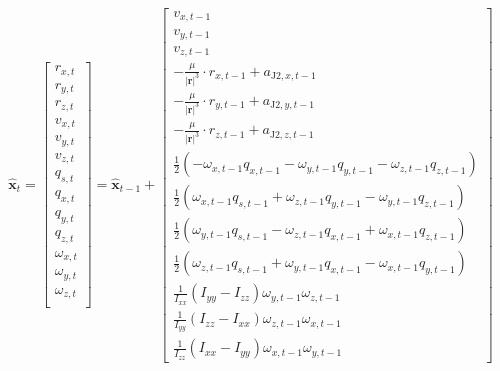 \begin{equation}
    \mathbf{\hat{x}}_t
    =
    \begin{bmatrix}
        r_{x,t} \\
        r_{y,t} \\
        r_{z,t} \\
        v_{x,t} \\
        v_{y,t} \\
        v_{z,t} \\
        q_{s,t} \\
        q_{x,t} \\
        q_{y,t} \\
        q_{z,t} \\
        \omega_{x,t} \\
        \omega_{y,t} \\
        \omega_{z,t} \\
    \end{bmatrix}
    = \mathbf{\hat{x}}_{t-1} +
    \begin{bmatrix}
        v_{x,t-1} \\
        v_{y,t-1} \\
        v_{z,t-1} \\
        -\frac{\mu}{|\mathbf{r}|^3}\cdot r_{x,t-1} + a_{\text{J2},x,t-1} \\
        -\frac{\mu}{|\mathbf{r}|^3}\cdot r_{y,t-1} + a_{\text{J2},y,t-1} \\
        -\frac{\mu}{|\mathbf{r}|^3}\cdot r_{z,t-1} + a_{\text{J2},z,t-1} \\
        \frac{1}{2}(-\omega_{x,t-1}q_{x,t-1} - \omega_{y,t-1}q_{y,t-1} - \omega_{z,t-1}q_{z,t-1}) \\
        \frac{1}{2}( \omega_{x,t-1}q_{s,t-1} + \omega_{z,t-1}q_{y,t-1} - \omega_{y,t-1}q_{z,t-1}) \\
        \frac{1}{2}( \omega_{y,t-1}q_{s,t-1} - \omega_{z,t-1}q_{x,t-1} + \omega_{x,t-1}q_{z,t-1}) \\
        \frac{1}{2}( \omega_{z,t-1}q_{s,t-1} + \omega_{y,t-1}q_{x,t-1} - \omega_{x,t-1}q_{y,t-1}) \\
        \frac{1}{\mathit{I}_{xx}}(\mathit{I}_{yy}-\mathit{I}_{zz})\omega_{y,t-1}\omega_{z,t-1} \\
        \frac{1}{\mathit{I}_{yy}}(\mathit{I}_{zz}-\mathit{I}_{xx})\omega_{z,t-1}\omega_{x,t-1} \\
        \frac{1}{\mathit{I}_{zz}}(\mathit{I}_{xx}-\mathit{I}_{yy})\omega_{x,t-1}\omega_{y,t-1}
    \end{bmatrix}

\end{equation}

